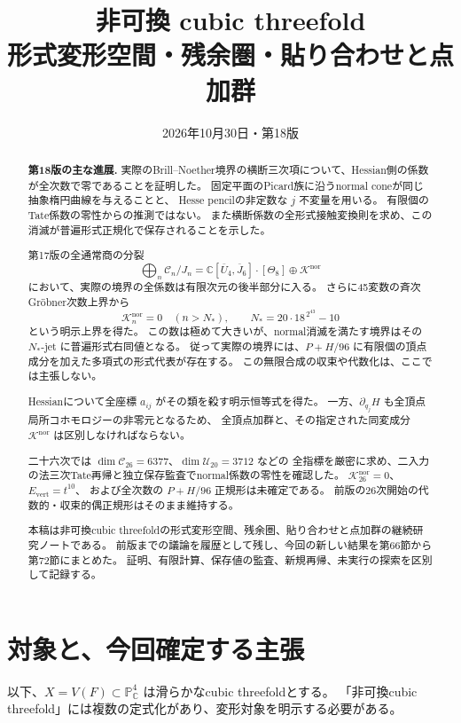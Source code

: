 \documentclass[a4paper,11pt]{ltjsarticle}
\title{\bfseries 非可換 cubic threefold\\[0.35em]
\large 形式変形空間・残余圏・貼り合わせと点加群}
\author{}
\date{2026年10月30日・第18版}
\theoremstyle{definition}
\newcommand{\CC}{\mathbb C}
\newcommand{\PP}{\mathbb P}
\begin{document}
\maketitle
\vspace{-1.5em}
\begin{abstract}
\noindent\textbf{第18版の主な進展.}
実際のBrill--Noether境界の横断三次項について、Hessian側の係数が全次数で零であることを証明した。
固定平面のPicard族に沿うnormal coneが同じ抽象楕円曲線を与えることと、
Hesse pencilの非定数な $j$ 不変量を用いる。
有限個のTate係数の零性からの推測ではない。
また横断係数の全形式接触変換則を求め、この消滅が普遍形式正規化で保存されることを示した。

第17版の全通常商の分裂
\[
 \bigoplus_n\mathcal C_n/J_n
 =\mathbb C[\overline U_4,\overline J_6]\cdot[\Theta_8]
       \oplus\mathcal K^{\mathrm{nor}}
\]
において、実際の境界の全係数は有限次元の後半部分に入る。
さらに45変数の斉次Gr\"obner次数上界から
\[
 \mathcal K_n^{\mathrm{nor}}=0\quad(n>N_*),
 \qquad N_*=20\cdot18^{\,2^{43}}-10
\]
という明示上界を得た。
この数は極めて大きいが、normal消滅を満たす境界はその $N_*$-jet に普遍形式右同値となる。
従って実際の境界には、$P+H/96$ に有限個の頂点成分を加えた多項式の形式代表が存在する。
この無限合成の収束や代数化は、ここでは主張しない。

Hessianについて全座標 $a_{ij}$ がその類を殺す明示恒等式を得た。
一方、$\partial_{q_j}H$ も全頂点局所コホモロジーの非零元となるため、
全頂点加群と、その指定された同変成分 $\mathcal K^{\mathrm{nor}}$ は区別しなければならない。

二十六次では $\dim\mathcal C_{26}=6377$、$\dim\mathcal U_{20}=3712$ などの
全指標を厳密に求め、二入力の法三次Tate再帰と独立保存監査でnormal係数の零性を確認した。
$\mathcal K_{26}^{\mathrm{nor}}=0$、$E_{\mathrm{vert}}=t^{10}$、
および全次数の $P+H/96$ 正規形は未確定である。
前版の26次開始の代数的・収束的偶正規形はそのまま維持する。

本稿は非可換cubic threefoldの形式変形空間、残余圏、貼り合わせと点加群の継続研究ノートである。
前版までの議論を履歴として残し、今回の新しい結果を第66節から第72節にまとめた。
証明、有限計算、保存値の監査、新規再帰、未実行の探索を区別して記録する。

\end{abstract}

\section{対象と、今回確定する主張}

以下、$X=V(F)\subset\PP^4_{\CC}$ は滑らかなcubic threefoldとする。
「非可換cubic threefold」には複数の定式化があり、変形対象を明示する必要がある。
\end{document}
